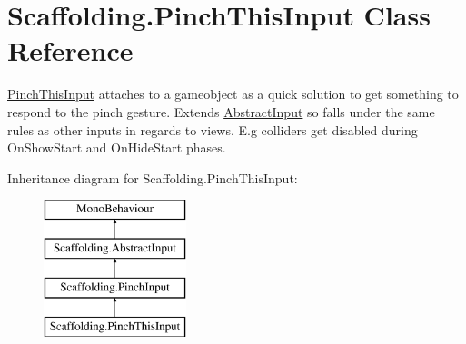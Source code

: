 \hypertarget{class_scaffolding_1_1_pinch_this_input}{\section{Scaffolding.\-Pinch\-This\-Input Class Reference}
\label{class_scaffolding_1_1_pinch_this_input}
}


\hyperlink{class_scaffolding_1_1_pinch_this_input}{Pinch\-This\-Input} attaches to a gameobject as a quick solution to get something to respond to the pinch gesture. Extends \hyperlink{class_scaffolding_1_1_abstract_input}{Abstract\-Input} so falls under the same rules as other inputs in regards to views. E.\-g colliders get disabled during On\-Show\-Start and On\-Hide\-Start phases.  


Inheritance diagram for Scaffolding.\-Pinch\-This\-Input\-:\begin{figure}[H]
\begin{center}
\leavevmode
\includegraphics[height=4.000000cm]{class_scaffolding_1_1_pinch_this_input}
\end{center}
\end{figure}
